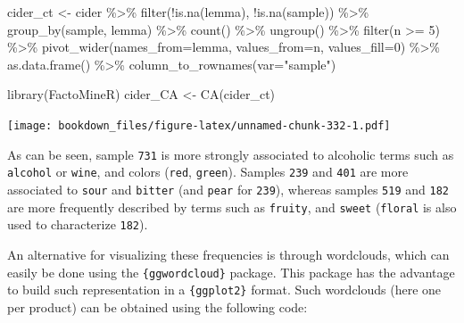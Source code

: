 \documentclass[
]{krantz}
\makeatletter
\newenvironment{Shaded}{\begin{snugshade}}{\end{snugshade}}
\newcommand{\AttributeTok}[1]{\textcolor[rgb]{0.61,0.61,0.61}{#1}}
\newcommand{\DecValTok}[1]{\textcolor[rgb]{0.06,0.06,0.06}{#1}}
\newcommand{\FunctionTok}[1]{\textcolor[rgb]{0,0,0}{#1}}
\newcommand{\NormalTok}[1]{#1}
\newcommand{\OtherTok}[1]{\textcolor[rgb]{0.37,0.37,0.37}{#1}}
\newcommand{\SpecialCharTok}[1]{\textcolor[rgb]{0,0,0}{#1}}
\newcommand{\StringTok}[1]{\textcolor[rgb]{0.5,0.5,0.5}{#1}}
\newenvironment{kframe}{%
\medskip{}
\setlength{\fboxsep}{.8em}
 \def\at@end@of@kframe{}%
 \ifinner\ifhmode%
  \def\at@end@of@kframe{\end{minipage}}%
  \begin{minipage}{\columnwidth}%
 \fi\fi%
 \def\FrameCommand##1{\hskip\@totalleftmargin \hskip-\fboxsep
 \colorbox{shadecolor}{##1}\hskip-\fboxsep
     \hskip-\linewidth \hskip-\@totalleftmargin \hskip\columnwidth}%
 \MakeFramed {\advance\hsize-\width
   \@totalleftmargin\z@ \linewidth\hsize
   \@setminipage}}%
 {\par\unskip\endMakeFramed%
 \at@end@of@kframe}
\renewenvironment{Shaded}{\begin{kframe}}{\end{kframe}}
\makeatother
\begin{document}
\begin{Shaded}
\begin{Highlighting}[]
\NormalTok{cider\_ct }\OtherTok{\textless{}{-}}\NormalTok{ cider }\SpecialCharTok{\%\textgreater{}\%} 
  \FunctionTok{filter}\NormalTok{(}\SpecialCharTok{!}\FunctionTok{is.na}\NormalTok{(lemma), }\SpecialCharTok{!}\FunctionTok{is.na}\NormalTok{(sample)) }\SpecialCharTok{\%\textgreater{}\%} 
  \FunctionTok{group\_by}\NormalTok{(sample, lemma) }\SpecialCharTok{\%\textgreater{}\%} 
  \FunctionTok{count}\NormalTok{() }\SpecialCharTok{\%\textgreater{}\%} 
  \FunctionTok{ungroup}\NormalTok{() }\SpecialCharTok{\%\textgreater{}\%} 
  \FunctionTok{filter}\NormalTok{(n }\SpecialCharTok{\textgreater{}=} \DecValTok{5}\NormalTok{) }\SpecialCharTok{\%\textgreater{}\%} 
  \FunctionTok{pivot\_wider}\NormalTok{(}\AttributeTok{names\_from=}\NormalTok{lemma, }\AttributeTok{values\_from=}\NormalTok{n, }\AttributeTok{values\_fill=}\DecValTok{0}\NormalTok{) }\SpecialCharTok{\%\textgreater{}\%} 
  \FunctionTok{as.data.frame}\NormalTok{() }\SpecialCharTok{\%\textgreater{}\%} 
  \FunctionTok{column\_to\_rownames}\NormalTok{(}\AttributeTok{var=}\StringTok{"sample"}\NormalTok{)}

\FunctionTok{library}\NormalTok{(FactoMineR)}
\NormalTok{cider\_CA }\OtherTok{\textless{}{-}} \FunctionTok{CA}\NormalTok{(cider\_ct)}
\end{Highlighting}
\end{Shaded}

\texttt{[image: bookdown\_files/figure-latex/unnamed-chunk-332-1.pdf]}

As can be seen, sample \texttt{731} is more strongly associated to alcoholic terms such as \texttt{alcohol} or \texttt{wine}, and colors (\texttt{red}, \texttt{green}). Samples \texttt{239} and \texttt{401} are more associated to \texttt{sour} and \texttt{bitter} (and \texttt{pear} for \texttt{239}), whereas samples \texttt{519} and \texttt{182} are more frequently described by terms such as \texttt{fruity}, and \texttt{sweet} (\texttt{floral} is also used to characterize \texttt{182}).

An alternative for visualizing these frequencies is through wordclouds, which can easily be done using the \texttt{\{ggwordcloud\}} package. This package has the advantage to build such representation in a \texttt{\{ggplot2\}} format. Such wordclouds (here one per product) can be obtained using the following code:
\end{document}
